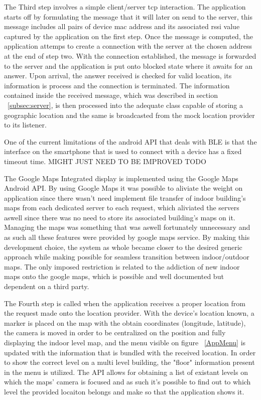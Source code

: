 The Third step involves a simple client/server tcp interaction. The application starts off by formulating the message that it will later on send to the server, this message includes all pairs of device mac address and its associated rssi value captured by the application on the first step. Once the message is computed, the application attemps to create a connection with the server at the chosen address at the end of step two. With the connection established, the message is forwarded to the server and the application is put onto blocked state where it awaits for an answer. Upon arrival, the answer received is checked for valid location, its information is process and the connection is terminated. The information contained inside the received message, which was described in section ~\ref{subsec:server}, is then processed into the adequate class capable of storing a geographic location and the same is broadcasted from the mock location provider to its listener. 



One of the current limitations of the android API that deals with BLE is that the interface on the smartphone that is used to connect with a device has a fixed timeout time.  MIGHT JUST NEED TO BE IMPROVED TODO


The Google Maps Integrated display is implemented using the Google Maps Android API. By using Google Maps it was possible to aliviate the weight on application since there wasn't need implement file transfer of indoor building's maps from each dedicated server to each request, which aliviated the servers aswell since there was no need to store its associated building's maps on it. Managing the maps was something that was aswell fortunately unnecessary and as such all these features were provided by google maps service. By making this development choice, the system as whole became closer to the desired generic approach while making possible for seamless transition between indoor/outdoor maps. The only imposed restriction is related to the addiction of new indoor maps onto the google maps, which is possible and well documented but dependent on a third party.

The Fourth step is called when the application receives a proper location from the request made onto the location provider. With the device's location known, a marker is placed on the map with the obtain coordinates (longitude, latitude), the camera is moved in order to be centralized on the position and fully displaying the indoor level map, and the menu visible on figure ~\ref{AppMenu} is updated with the information that is bundled with the received location. In order to show the correct level on a multi level building, the "floor" information present in the menu is utilized. The API allows for obtaining a list of existant levels on which the maps' camera is focused and as such it's possible to find out to which level the provided locaiton belongs and make so that the application shows it.

